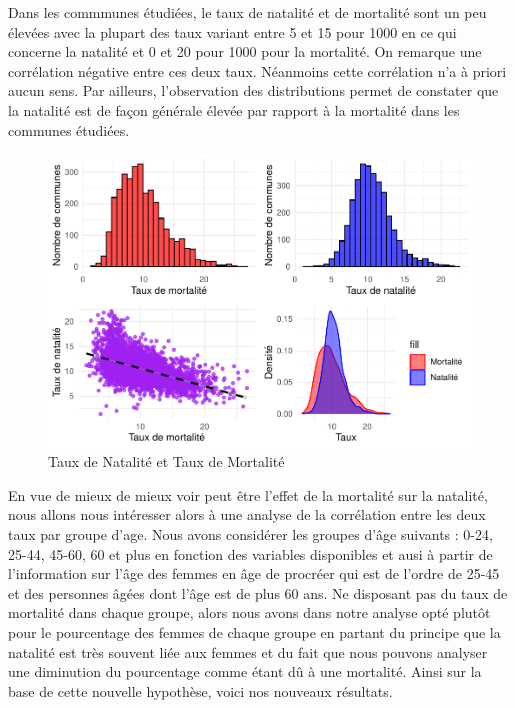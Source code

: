 \documentclass[
]{article}
\begin{document}
Dans les commmunes étudiées, le taux de natalité et de mortalité sont un
peu élevées avec la plupart des taux variant entre 5 et 15 pour 1000 en
ce qui concerne la natalité et 0 et 20 pour 1000 pour la mortalité. On
remarque une corrélation négative entre ces deux taux. Néanmoins cette
corrélation n'a à priori aucun sens. Par ailleurs, l'observation des
distributions permet de constater que la natalité est de façon générale
élevée par rapport à la mortalité dans les communes étudiées.

\begin{figure}

{\centering \includegraphics{4_Analyse_Descriptive_files/figure-latex/unnamed-chunk-4-1} 

}

\caption{Taux de Natalité et Taux de Mortalité}\label{fig:unnamed-chunk-4}
\end{figure}

En vue de mieux de mieux voir peut être l'effet de la mortalité sur la
natalité, nous allons nous intéresser alors à une analyse de la
corrélation entre les deux taux par groupe d'age. Nous avons considérer
les groupes d'âge suivants : 0-24, 25-44, 45-60, 60 et plus en fonction
des variables disponibles et ausi à partir de l'information sur l'âge
des femmes en âge de procréer qui est de l'ordre de 25-45 et des
personnes âgées dont l'âge est de plus 60 ans. Ne disposant pas du taux
de mortalité dans chaque groupe, alors nous avons dans notre analyse
opté plutôt pour le pourcentage des femmes de chaque groupe en partant
du principe que la natalité est très souvent liée aux femmes et du fait
que nous pouvons analyser une diminution du pourcentage comme étant dû à
une mortalité. Ainsi sur la base de cette nouvelle hypothèse, voici nos
nouveaux résultats.
\end{document}
